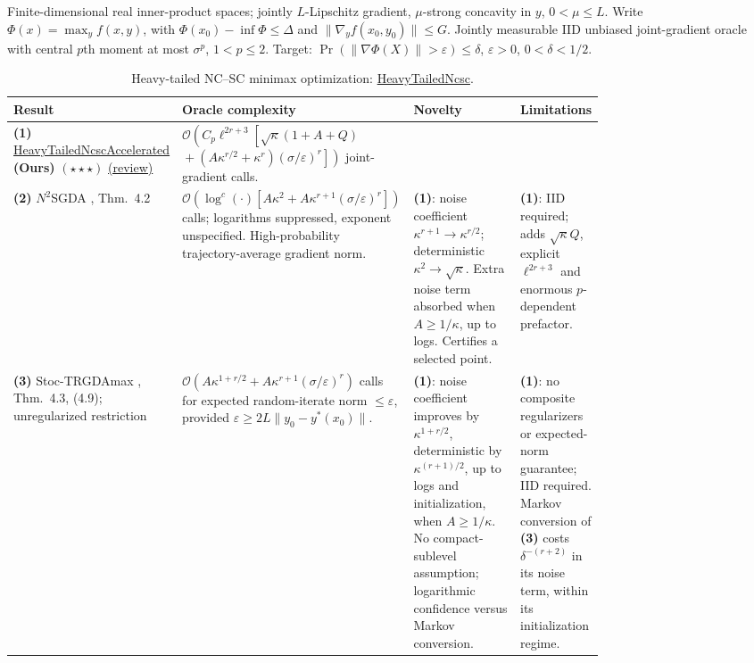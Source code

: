 \begin{table}[tp]
\centering
\caption{Heavy-tailed NC--SC minimax optimization: \href{https://github.com/k3nfalt/longtails/blob/main/LongTails/Setups/HeavyTailedNcsc.lean}{HeavyTailedNcsc}.}\label{tab:HeavyTailedNcsc}
\parbox{\linewidth}{\footnotesize Finite-dimensional real inner-product spaces; jointly $L$-Lipschitz gradient, $\mu$-strong concavity in $y$, $0<\mu\le L$. Write $\Phi(x)=\max_y f(x,y)$, with $\Phi(x_0)-\inf\Phi\le\Delta$ and $\|\nabla_y f(x_0,y_0)\|\le G$. Jointly measurable IID unbiased joint-gradient oracle with central $p$th moment at most $\sigma^p$, $1<p\le2$. Target: $\Pr(\|\nabla\Phi(X)\|>\varepsilon)\le\delta$, $\varepsilon>0$, $0<\delta<1/2$.}\par\smallskip
\begin{threeparttable}
\footnotesize
\setlength{\tabcolsep}{4pt}\renewcommand{\arraystretch}{1.25}
\begin{tabularx}{\linewidth}{@{}>{\raggedright\arraybackslash}p{0.20\linewidth}>{\raggedright\arraybackslash}p{0.32\linewidth}>{\raggedright\arraybackslash}p{0.25\linewidth}>{\raggedright\arraybackslash}X@{}}
\toprule
\textbf{Result} & \textbf{Oracle complexity} & \textbf{Novelty} & \textbf{Limitations} \\
\midrule
\textbf{(1)} \href{https://github.com/k3nfalt/longtails/blob/main/LongTails/Theorems/HeavyTailedNcscAccelerated.lean}{Heavy\allowbreak Tailed\allowbreak Ncsc\allowbreak Accelerated} \textbf{(Ours)} $(\star\star\star)$ \href{https://github.com/k3nfalt/longtails/blob/main/scripts/reviews/HeavyTailedNcscAccelerated.md}{(review)} & $\mathcal{O}\!\left(C_p\ell^{2r+3}\left[\sqrt\kappa(1+A+Q)\right.\right.$\newline $\left.\left.{}+(A\kappa^{r/2}+\kappa^r)(\sigma/\varepsilon)^r\right]\right)$ joint-gradient calls. & & \\
\midrule[1.2pt]
\textbf{(2)} $N^2$SGDA \citep{htLiuV3}, Thm.~4.2 & $\mathcal{O}(\log^c(\cdot)[A\kappa^2+A\kappa^{r+1}(\sigma/\varepsilon)^r])$ calls; logarithms suppressed, exponent unspecified. High-probability trajectory-average gradient norm. & \textbf{(1)}: noise coefficient $\kappa^{r+1}\to\kappa^{r/2}$; deterministic $\kappa^2\to\sqrt\kappa$. Extra noise term absorbed when $A\ge1/\kappa$, up to logs. Certifies a selected point. & \textbf{(1)}: IID required; adds $\sqrt\kappa Q$, explicit $\ell^{2r+3}$ and enormous $p$-dependent prefactor. \\
\midrule
\textbf{(3)} Stoc-TRGDAmax \citep{htZhuV1}, Thm.~4.3, (4.9); unregularized restriction & $\mathcal{O}(A\kappa^{1+r/2}+A\kappa^{r+1}(\sigma/\varepsilon)^r)$ calls for expected random-iterate norm $\le\varepsilon$, provided $\varepsilon\ge2L\|y_0-y^*(x_0)\|$. & \textbf{(1)}: noise coefficient improves by $\kappa^{1+r/2}$, deterministic by $\kappa^{(r+1)/2}$, up to logs and initialization, when $A\ge1/\kappa$. No compact-sublevel assumption; logarithmic confidence versus Markov conversion. & \textbf{(1)}: no composite regularizers or expected-norm guarantee; IID required. Markov conversion of \textbf{(3)} costs $\delta^{-(r+2)}$ in its noise term, within its initialization regime. \\

\end{tabularx}
\end{threeparttable}
\end{table}
